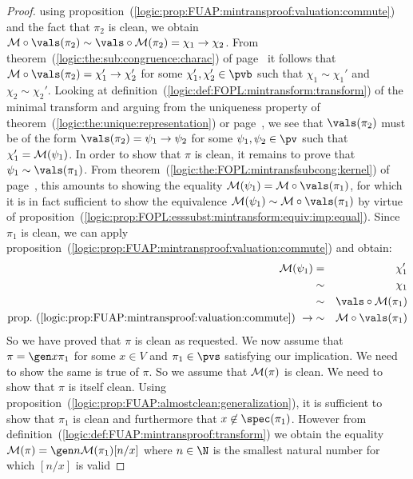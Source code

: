 \begin{proof}
using
proposition~(\ref{logic:prop:FUAP:mintransproof:valuation:commute})
and the fact that $\pi_{2}$ is clean, we obtain ${\cal
M}\circ\vals(\pi_{2})\sim\vals\circ{\cal
M}(\pi_{2})=\chi_{1}\to\chi_{2}$. From
theorem~(\ref{logic:the:sub:congruence:charac}) of
page~\pageref{logic:the:sub:congruence:charac} it follows that
${\cal M}\circ\vals(\pi_{2})=\chi_{1}'\to\chi_{2}'$ for some
$\chi_{1}',\chi_{2}'\in\pvb$ such that $\chi_{1}\sim\chi_{1}'$ and
$\chi_{2}\sim\chi_{2}'$. Looking at
definition~(\ref{logic:def:FOPL:mintransform:transform}) of the
minimal transform and arguing from the uniqueness property of
theorem~(\ref{logic:the:unique:representation}) or
page~\pageref{logic:the:unique:representation}, we see that
$\vals(\pi_{2})$ must be of the form
$\vals(\pi_{2})=\psi_{1}\to\psi_{2}$ for some
$\psi_{1},\psi_{2}\in\pv$ such that $\chi_{1}'={\cal M}(\psi_{1})$.
In order to show that $\pi$ is clean, it remains to prove that
$\psi_{1}\sim\vals(\pi_{1})$. From
theorem~(\ref{logic:the:FOPL:mintransfsubcong:kernel}) of
page~\pageref{logic:the:FOPL:mintransfsubcong:kernel}, this amounts
to showing the equality ${\cal M}(\psi_{1})={\cal
M}\circ\vals(\pi_{1})$, for which it is in fact sufficient to show
the equivalence ${\cal M}(\psi_{1})\sim{\cal M}\circ\vals(\pi_{1})$
by virtue of
proposition~(\ref{logic:prop:FOPL:esssubst:mintransform:equiv:imp:equal}).
Since $\pi_{1}$ is clean, we can apply
proposition~(\ref{logic:prop:FUAP:mintransproof:valuation:commute})
and obtain:
    \begin{eqnarray*}
    {\cal M}(\psi_{1})&=&\chi_{1}'\\
    &\sim&\chi_{1}\\
    &\sim&\vals\circ{\cal M}(\pi_{1})\\
    \mbox{prop.~(\ref{logic:prop:FUAP:mintransproof:valuation:commute})}\ \rightarrow
    &\sim&{\cal M}\circ\vals(\pi_{1})\\
    \end{eqnarray*}
So we have proved that $\pi$ is clean as requested. We now assume
that $\pi=\gen x\pi_{1}$ for some $x\in V$ and $\pi_{1}\in\pvs$
satisfying our implication. We need to show the same is true of
$\pi$. So we assume that ${\cal M}(\pi)$ is clean. We need to show
that $\pi$ is itself clean. Using
proposition~(\ref{logic:prop:FUAP:almostclean:generalization}), it
is sufficient to show that $\pi_{1}$ is clean and furthermore that
$x\not\in\spec(\pi_{1})$. However from
definition~(\ref{logic:def:FUAP:mintransproof:transform}) we obtain
the equality ${\cal M}(\pi)=\gen n{\cal M}(\pi_{1})[n/x]$ where
$n\in\N$ is the smallest natural number for which $[n/x]$ is valid

\end{proof}
